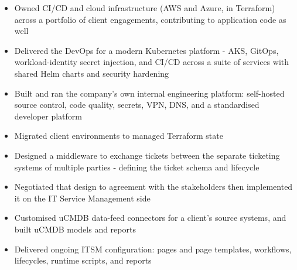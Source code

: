 \documentclass[10pt,a4paper,ragged2e,withhyper]{altacv}
\begin{document}
\begin{itemize}
\item Owned CI/CD and cloud infrastructure (AWS and Azure, in Terraform) across a portfolio of client engagements, contributing to application code as well
\item Delivered the DevOps for a modern Kubernetes platform - AKS, GitOps, workload-identity secret injection, and CI/CD across a suite of services with shared Helm charts and security hardening
\item Built and ran the company's own internal engineering platform: self-hosted source control, code quality, secrets, VPN, DNS, and a standardised developer platform
\item Migrated client environments to managed Terraform state
\end{itemize}
\divider

\begin{itemize}
\item Designed a middleware to exchange tickets between the separate ticketing systems of multiple parties - defining the ticket schema and lifecycle
\item Negotiated that design to agreement with the stakeholders then implemented it on the IT Service Management side
\item Customised uCMDB data-feed connectors for a client's source systems, and built uCMDB models and reports
\item Delivered ongoing ITSM configuration: pages and page templates, workflows, lifecycles, runtime scripts, and reports
\end{itemize}



\newpage
\end{document}
